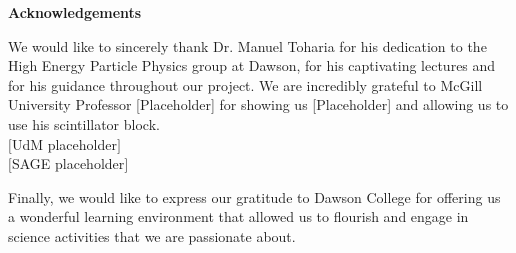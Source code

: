 \centering
\textbf{Acknowledgements}

We would like to sincerely thank Dr. Manuel Toharia for his dedication to the High Energy Particle Physics group at Dawson, for his captivating lectures and for his guidance throughout our project. We are incredibly grateful to McGill University Professor [Placeholder] for showing us [Placeholder] and allowing us to use his scintillator block. \\

$[$UdM placeholder$]$ \\
$[$SAGE placeholder$]$

Finally, we would like to express our gratitude to Dawson College for offering us a wonderful learning environment that allowed us to flourish and engage in science activities that we are passionate about. 
